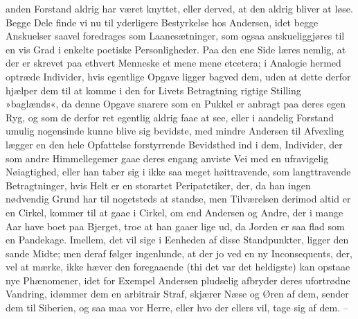 \documentclass[12pt,a4paper]{article}
\begin{document}
anden Forstand aldrig har været knyttet, eller derved, at den aldrig bliver at løse. Begge Dele finde vi nu til yderligere Bestyrkelse hos Andersen, idet begge Anskuelser saavel foredrages som Laanesætninger, som ogsaa anskueliggjøres til en vis Grad i enkelte poetiske Personligheder. Paa den ene Side læres nemlig, at der er skrevet paa ethvert Menneske et mene mene etcetera; i Analogie hermed optræde Individer, hvis egentlige Opgave ligger bagved dem, uden at dette derfor hjælper dem til at komme i den for Livets Betragtning rigtige Stilling »baglænds«, da denne Opgave snarere som en Pukkel er anbragt paa deres egen Ryg, og som de derfor ret egentlig aldrig faae at see, eller i aandelig Forstand umulig nogensinde kunne blive sig bevidste, med mindre Andersen til Afvexling lægger en den hele Opfattelse forstyrrende Bevidsthed ind i dem, Individer, der som andre Himmellegemer gaae deres engang anviste Vei med en ufravigelig Nøiagtighed, eller han taber sig i ikke saa meget høittravende, som langttravende Betragtninger, hvis Helt er en storartet Peripatetiker, der, da han ingen nødvendig Grund har til nogetsteds at standse, men Tilværelsen derimod altid er en Cirkel, kommer til at gaae i Cirkel, om end Andersen og Andre, der i mange Aar have boet paa Bjerget, troe at han gaaer lige ud, da Jorden er saa flad som en Pandekage. Imellem, det vil sige i Eenheden af disse Standpunkter, ligger den sande Midte; men deraf følger ingenlunde, at der jo ved en ny Inconsequents, der, vel at mærke, ikke hæver den foregaaende (thi det var det heldigste) kan opstaae nye Phænomener, idet for Exempel Andersen pludselig afbryder deres ufortrødne Vandring, idømmer dem en arbitrair Straf, skjærer Næse og Øren af dem, sender dem til Siberien, og saa maa vor Herre, eller hvo der ellers vil, tage sig af dem. –
\end{document}
